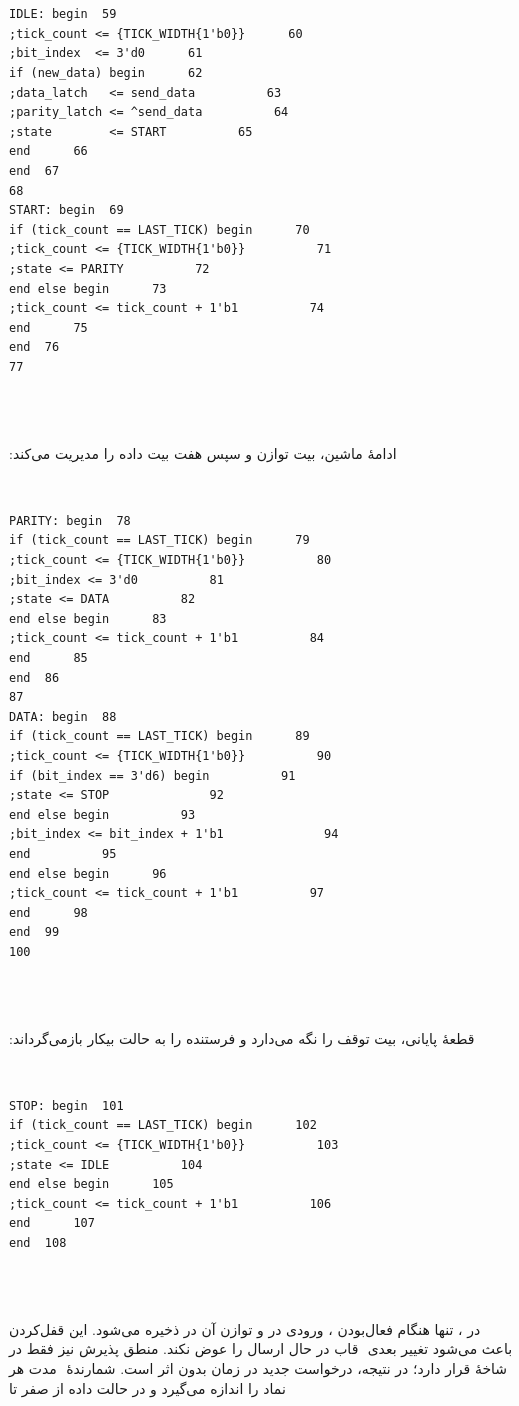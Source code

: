 ‫
‫\begin{dsdlcodeblock}
‫\begin{verbatim}
‫59  IDLE: begin
‫60      tick_count <= {TICK_WIDTH{1'b0}};
‫61      bit_index  <= 3'd0;
‫62      if (new_data) begin
‫63          data_latch   <= send_data;
‫64          parity_latch <= ^send_data;
‫65          state        <= START;
‫66      end
‫67  end
‫68
‫69  START: begin
‫70      if (tick_count == LAST_TICK) begin
‫71          tick_count <= {TICK_WIDTH{1'b0}};
‫72          state <= PARITY;
‫73      end else begin
‫74          tick_count <= tick_count + 1'b1;
‫75      end
‫76  end
‫77
‫\end{verbatim}
‫\end{dsdlcodeblock}
‫
‫ادامهٔ ماشین، بیت توازن و سپس هفت بیت داده را مدیریت می‌کند:
‫
‫\begin{dsdlcodeblock}
‫\begin{verbatim}
‫78  PARITY: begin
‫79      if (tick_count == LAST_TICK) begin
‫80          tick_count <= {TICK_WIDTH{1'b0}};
‫81          bit_index <= 3'd0;
‫82          state <= DATA;
‫83      end else begin
‫84          tick_count <= tick_count + 1'b1;
‫85      end
‫86  end
‫87
‫88  DATA: begin
‫89      if (tick_count == LAST_TICK) begin
‫90          tick_count <= {TICK_WIDTH{1'b0}};
‫91          if (bit_index == 3'd6) begin
‫92              state <= STOP;
‫93          end else begin
‫94              bit_index <= bit_index + 1'b1;
‫95          end
‫96      end else begin
‫97          tick_count <= tick_count + 1'b1;
‫98      end
‫99  end
‫100
‫\end{verbatim}
‫\end{dsdlcodeblock}
‫
‫قطعهٔ پایانی، بیت توقف را نگه می‌دارد و فرستنده را به حالت بیکار بازمی‌گرداند:
‫
‫\begin{dsdlcodeblock}
‫\begin{verbatim}
‫101  STOP: begin
‫102      if (tick_count == LAST_TICK) begin
‫103          tick_count <= {TICK_WIDTH{1'b0}};
‫104          state <= IDLE;
‫105      end else begin
‫106          tick_count <= tick_count + 1'b1;
‫107      end
‫108  end
‫\end{verbatim}
‫\end{dsdlcodeblock}
‫
‫در ، تنها هنگام فعال‌بودن ، ورودی در  و
‫توازن آن در  ذخیره می‌شود. این قفل‌کردن باعث
‫می‌شود تغییر بعدی
‫ قاب در حال ارسال را عوض نکند. منطق پذیرش نیز فقط در شاخهٔ 
‫قرار دارد؛ در نتیجه، درخواست جدید در زمان  بدون اثر است. شمارندهٔ
‫ مدت هر نماد را اندازه می‌گیرد و  در حالت داده از صفر تا
